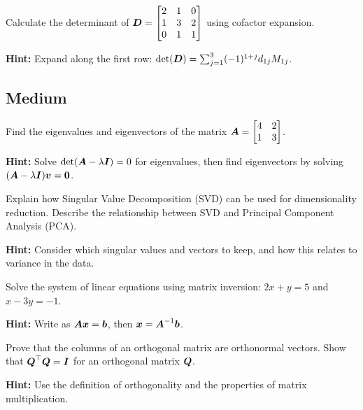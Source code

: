 \begin{problem}
Calculate the determinant of $\boldsymbol{D} = \begin{bmatrix} 2 & 1 & 0 \\ 1 & 3 & 2 \\ 0 & 1 & 1 \end{bmatrix}$ using cofactor expansion.

\textbf{Hint:} Expand along the first row: $\det(\boldsymbol{D}) = \sum_{j=1}^{3} (-1)^{1+j} d_{1j} M_{1j}$.
\end{problem}

\subsection*{Medium}

\begin{problem}
Find the eigenvalues and eigenvectors of the matrix $\boldsymbol{A} = \begin{bmatrix} 4 & 2 \\ 1 & 3 \end{bmatrix}$.

\textbf{Hint:} Solve $\det(\boldsymbol{A} - \lambda \boldsymbol{I}) = 0$ for eigenvalues, then find eigenvectors by solving $(\boldsymbol{A} - \lambda \boldsymbol{I})\boldsymbol{v} = \boldsymbol{0}$.
\end{problem}

\begin{problem}
Explain how Singular Value Decomposition (SVD) can be used for dimensionality reduction. Describe the relationship between SVD and Principal Component Analysis (PCA).

\textbf{Hint:} Consider which singular values and vectors to keep, and how this relates to variance in the data.
\end{problem}

\begin{problem}
Solve the system of linear equations using matrix inversion: $2x + y = 5$ and $x - 3y = -1$.

\textbf{Hint:} Write as $\boldsymbol{A}\boldsymbol{x} = \boldsymbol{b}$, then $\boldsymbol{x} = \boldsymbol{A}^{-1}\boldsymbol{b}$.
\end{problem}

\begin{problem}
Prove that the columns of an orthogonal matrix are orthonormal vectors. Show that $\boldsymbol{Q}^\top\boldsymbol{Q} = \boldsymbol{I}$ for an orthogonal matrix $\boldsymbol{Q}$.

\textbf{Hint:} Use the definition of orthogonality and the properties of matrix multiplication.
\end{problem}

